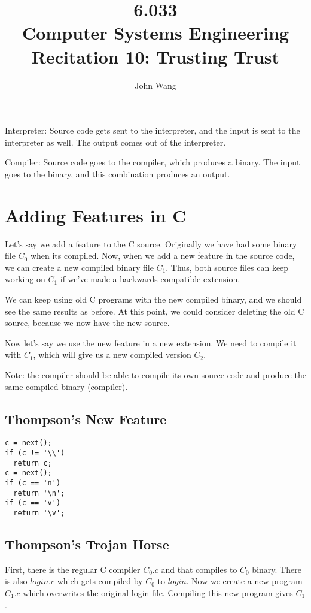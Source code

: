 \documentclass[psamsfonts]{amsart}
\title{6.033 \\
Computer Systems Engineering \\
Recitation 10: Trusting Trust}
\author{John Wang}
\begin{document}
\maketitle

Interpreter: Source code gets sent to the interpreter, and the input is sent to the interpreter as well. The output comes out of the interpreter.

Compiler: Source code goes to the compiler, which produces a binary. The input goes to the binary, and this combination produces an output.

\section{Adding Features in C}

Let's say we add a feature to the C source. Originally we have had some binary file $C_0$ when its compiled. Now, when we add a new feature in the source code, we can create a new compiled binary file $C_1$. Thus, both source files can keep working on $C_1$ if we've made a backwards compatible extension.

We can keep using old C programs with the new compiled binary, and we should see the same results as before. At this point, we could consider deleting the old C source, because we now have the new source.

Now let's say we use the new feature in a new extension. We need to compile it with $C_1$, which will give us a new compiled version $C_2$.

Note: the compiler should be able to compile its own source code and produce the same compiled binary (compiler).

\subsection{Thompson's New Feature}

\begin{verbatim}
c = next();
if (c != '\\')
  return c;
c = next();
if (c == 'n')
  return '\n';
if (c == 'v')
  return '\v';
\end{verbatim}

\subsection{Thompson's Trojan Horse}

First, there is the regular C compiler $C_0.c$ and that compiles to $C_0$ binary. There is also $login.c$ which gets compiled by $C_0$ to $login$. Now we create a new program $C_1.c$ which overwrites the original login file. Compiling this new program gives $C_1$.
\end{document}
